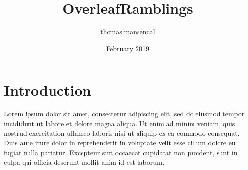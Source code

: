 \documentclass{article}
\title{OverleafRamblings}
\author{thomas.mansencal }
\date{February 2019}
\begin{document}
\maketitle

\section{Introduction}

Lorem ipsum dolor sit amet, consectetur adipiscing elit, sed do eiusmod tempor
incididunt ut labore et dolore magna aliqua. Ut enim ad minim veniam, quis
nostrud exercitation ullamco laboris nisi ut aliquip ex ea commodo consequat.
Duis aute irure dolor in reprehenderit in voluptate velit esse cillum dolore
eu fugiat nulla pariatur. Excepteur sint occaecat cupidatat non proident,
sunt in culpa qui officia deserunt mollit anim id est laborum.
\end{document}
